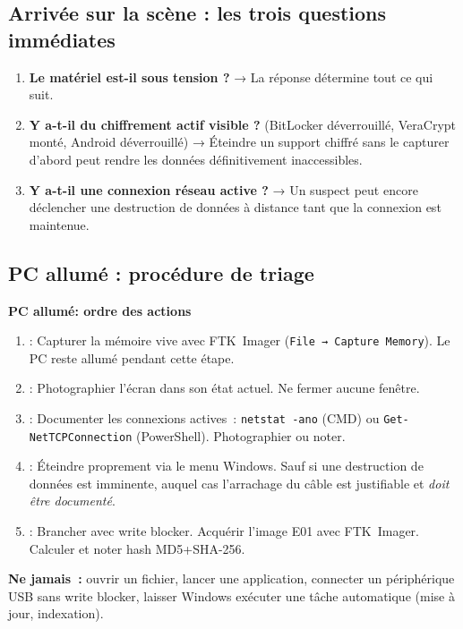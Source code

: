 \subsection{Arrivée sur la scène : les trois questions immédiates}

\begin{enumerate}
    \item \textbf{Le matériel est-il sous tension ?} → La réponse détermine
          tout ce qui suit.
    \item \textbf{Y a-t-il du chiffrement actif visible ?}
          (BitLocker déverrouillé, VeraCrypt monté, Android déverrouillé) →
          Éteindre un support chiffré sans le capturer d'abord peut rendre
          les données définitivement inaccessibles.
    \item \textbf{Y a-t-il une connexion réseau active ?} → Un suspect peut
          encore déclencher une destruction de données à distance tant que
          la connexion est maintenue.
\end{enumerate}

\subsection{PC allumé : procédure de triage}

\begin{boxPNC}
\textbf{PC allumé: ordre des actions}

\begin{enumerate}
    \item {}: Capturer la mémoire vive avec FTK~Imager
          (\texttt{File → Capture Memory}). Le PC reste allumé pendant
          cette étape.
    \item {}: Photographier l'écran dans son état
          actuel. Ne fermer aucune fenêtre.
    \item {}: Documenter les connexions actives~:
          \texttt{netstat -ano} (CMD) ou \texttt{Get-NetTCPConnection}
          (PowerShell). Photographier ou noter.
    \item {}: Éteindre proprement via le menu Windows.
          Sauf si une destruction de données est imminente, auquel cas
          l'arrachage du câble est justifiable et \emph{doit être documenté}.
    \item {}: Brancher avec write blocker. Acquérir
          l'image E01 avec FTK~Imager. Calculer et noter hash MD5+SHA-256.
\end{enumerate}

\medskip
\textbf{Ne jamais~:} ouvrir un fichier, lancer une application, connecter
un périphérique USB sans write blocker, laisser Windows exécuter une tâche
automatique (mise à jour, indexation).
\end{boxPNC}

